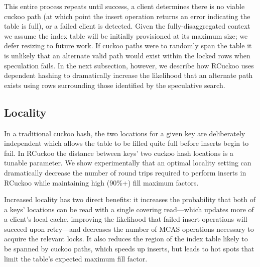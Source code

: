 
This entire process repeats until success, a client determines there
is no viable cuckoo path (at which point the insert operation returns
an error indicating the table is full), or a failed client is detected.  Given the fully-disaggregated
context we assume the index table will be initially provisioned at its
maximum size; we defer resizing to future work.
If cuckoo paths were to randomly span the table it is unlikely that an
alternate valid path would exist within the locked rows when
speculation fails.  In the next subsection, however, we describe how
RCuckoo uses dependent hashing to dramatically increase the likelihood
that an alternate path exists using rows surrounding those identified
by the speculative search.






\subsection{Locality}



In a traditional cuckoo hash, the two locations for a given key are
deliberately independent which allows the table to be filled quite
full before inserts begin to fail. 
%
In RCuckoo the distance between keys' two cuckoo hash locations is a
tunable parameter.
We show experimentally that an optimal locality
setting can dramatically decrease the number of round trips required
to perform inserts in RCuckoo while maintaining high (90\%+) fill
maximum factors.

Increased locality has two direct benefits: it
increases the probability that both of a keys' locations can be read
with a single covering read---which updates more of a client's local
cache, improving the likelihood that failed insert operations will
succeed upon retry---and decreases the number of MCAS operations
necessary to acquire the relevant locks.  It also reduces the region
of the index table likely to be spanned by cuckoo paths, which speeds
up inserts, but leads to hot spots that limit the table's expected
maximum fill factor.  


